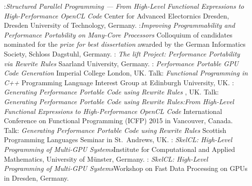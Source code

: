          {:\newline \emph{Structured Parallel Programming --- From High-Level Functional Expressions to High-Performance OpenCL Code}\newline
         Center for Advanced Electornics Dresden, Dresden University of Technology, Germany.
         }
         {:\newline \emph{Improving Programmability and Performance Portability on Many-Core Processors}\newline
         \small Colloquium of candidates nominated for the \emph{prize for best dissertation} awarded by the German Informatics Society, Schloss Dagstuhl, Germany.}
         {: \emph{The lift Project: Performance Portability via Rewrite Rules}\newline
          \small Saarland University, Germany.}
         {: \emph{Performance Portable GPU Code Generation}\newline
         \small Imperial College London, UK.}
         {Talk: \emph{Functional Programming in C++}\newline
         \small Programming Language Interest Group at Edinburgh University, UK.}
         {: \emph{Generating Performance Portable Code using Rewrite Rules}\newline
         \small {}, UK.}
         {Talk: \emph{Generating Performance Portable Code using Rewrite Rules:\newline From High-Level Functional Expressions to High-Performance OpenCL Code}\newline
         \small International Conference on Functional Programming (ICFP) 2015 in Vancouver, Canada.}
         {Talk: \emph{Generating Performance Portable Code using Rewrite Rules}\newline
         \small Scottish Programming Languages Seminar in St.\ Andrews, UK.}
         {: \emph{SkelCL\@: High-Level Programming of Multi-GPU
          Systems}\newline \small Institute for Computational and Applied
          Mathematics, University of Münster, Germany.}
         {: \emph{SkelCL\@: High-Level Programming of Multi-GPU
          Systems}\newline \small Workshop on Fast Data Processing on GPUs in
          Dresden, Germany.}
